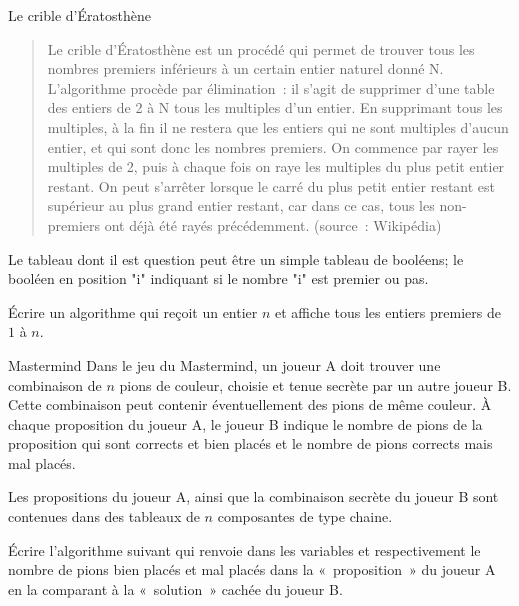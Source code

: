 	\begin{Exercice}{Le crible d’Ératosthène}
		\begin{quote}
			\og{} Le crible d’Ératosthène est un procédé 
			qui permet de trouver tous les nombres premiers inférieurs 
			à un certain entier naturel donné N.
			L’algorithme procède par élimination~: 
			il s’agit de supprimer d’une table des entiers de 2 à N 
			tous les multiples d’un entier. 
			En supprimant tous les multiples, 
			à la fin il ne restera que les entiers qui ne sont multiples d’aucun entier, 
			et qui sont donc les nombres premiers.
			On commence par rayer les multiples de 2, 
			puis à chaque fois on raye les multiples du plus petit entier restant.
			On peut s’arrêter lorsque le carré du plus petit entier restant 
			est supérieur au plus grand entier restant, car dans ce cas, 
			tous les non-premiers ont déjà été rayés précédemment.\fg{}
			(source~: Wikipédia)
		\end{quote}
		Le tableau dont il est question peut être un simple tableau
		de booléens; le booléen en position "i" indiquant 
		si le nombre "i" est premier ou pas.

		Écrire un algorithme qui reçoit un entier $n$
		et affiche tous les entiers premiers de $1$ à $n$.
	\end{Exercice}
	
	\begin{Exercice}{Mastermind}
		Dans le jeu du Mastermind, 
		un joueur A doit trouver une combinaison de $n$ pions de couleur, 
		choisie et tenue secrète par un autre joueur B. 
		Cette combinaison peut contenir éventuellement des pions de même couleur. 
		À chaque proposition du joueur A, 
		le joueur B indique le nombre de pions de la proposition 
		qui sont corrects et bien placés 
		et le nombre de pions corrects mais mal placés. 
		
		Les propositions du joueur A, 
		ainsi que la combinaison secrète du joueur B
		sont contenues dans des tableaux de $n$ composantes de type chaine.
		
		Écrire l’algorithme suivant qui renvoie dans les variables
		 et 
		respectivement le nombre de pions bien placés et mal placés 
		dans la «~proposition~» du joueur A en la comparant 
		à la «~solution~» cachée du joueur B.
	
		\begin{LDA}
		\end{LDA}
	\end{Exercice}
	

